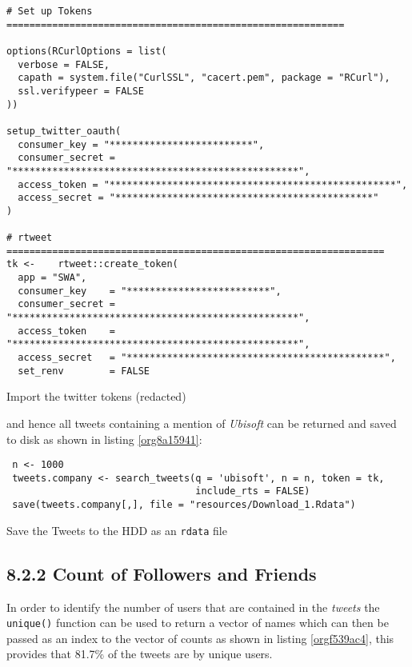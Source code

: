 \documentclass[11pt]{article}
\begin{document}
\begin{listing}[htbp]
\begin{verbatim}
# Set up Tokens ===========================================================

options(RCurlOptions = list(
  verbose = FALSE,
  capath = system.file("CurlSSL", "cacert.pem", package = "RCurl"),
  ssl.verifypeer = FALSE
))

setup_twitter_oauth(
  consumer_key = "*************************",
  consumer_secret = "**************************************************",
  access_token = "**************************************************",
  access_secret = "*********************************************"
)

# rtweet ==================================================================
tk <-    rtweet::create_token(
  app = "SWA",
  consumer_key    = "*************************",
  consumer_secret = "**************************************************",
  access_token    = "**************************************************",
  access_secret   = "*********************************************",
  set_renv        = FALSE
\end{verbatim}
\caption{\label{org805d2ae}Import the twitter tokens (redacted)}
\end{listing}

and hence all tweets containing a mention of \emph{Ubisoft} can be returned and saved to disk as shown in listing \ref{org8a15941}:

\begin{listing}[htbp]
\begin{verbatim}
 n <- 1000
 tweets.company <- search_tweets(q = 'ubisoft', n = n, token = tk,
                                 include_rts = FALSE)
 save(tweets.company[,], file = "resources/Download_1.Rdata")
\end{verbatim}
\caption{\label{org8a15941}Save the Tweets to the HDD as an \texttt{rdata} file}
\end{listing}


\subsection{8.2.2 Count of Followers and Friends}
\label{sec:org2e2ce73}
In order to identify the number of users that are contained in the \emph{tweets} the
\texttt{unique()} function can be used to return a vector of names which can then be passed as an index to the vector of counts as shown in listing \ref{orgf539ac4}, this provides that 81.7\% of the tweets are by unique users.
\end{document}
